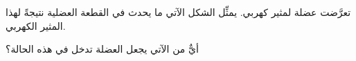 
\begin{question}

\begin{instance}
  
\begin{mcq}[standalone=false]
    
\begin{stem}
      تعرَّضت عضلة لمثير كهربي. يمثِّل الشكل الآتي ما يحدث في القطعة العضلية نتيجةً لهذا المثير الكهربي.\par      {}      أيٌّ من الآتي يجعل العضلة تدخل في هذه الحالة؟\par    
\end{stem}
    
\begin{distractors}
        
\end{distractors}
              
\end{mcq}

\end{instance}

\end{question}
